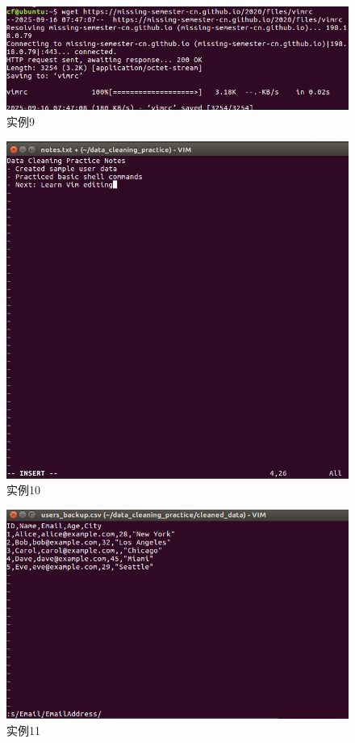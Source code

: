 \documentclass[cn,12pt]{report}
\begin{document}
      \begin{figure}[htbp]
    \centering
    \includegraphics[width=1\textwidth]{image/9.png}
    \caption{实例9}
  \end{figure}

      \begin{figure}[htbp]
    \centering
    \includegraphics[width=1\textwidth]{image/10.png}
    \caption{实例10}
  \end{figure}

      \begin{figure}[htbp]
    \centering
    \includegraphics[width=1\textwidth]{image/11.png}
    \caption{实例11}
  \end{figure}
\end{document}
